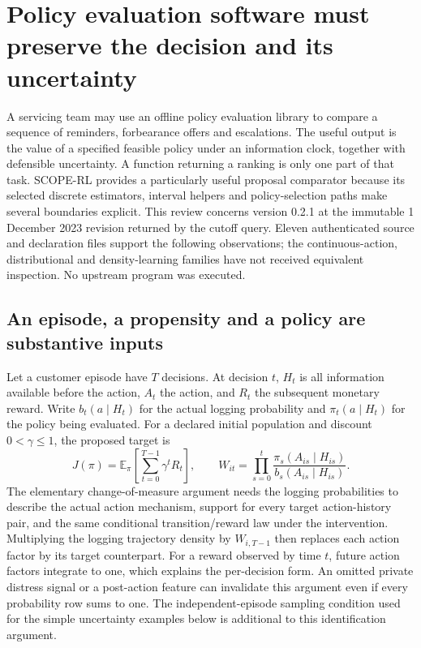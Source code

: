 \section{Policy evaluation software must preserve the decision and its uncertainty}
\label{exec23:scope-rl-scope}
A servicing team may use an offline policy evaluation library to compare a
sequence of reminders, forbearance offers and escalations. The useful output is
the value of a specified feasible policy under an information clock, together
with defensible uncertainty. A function returning a ranking is only one part of
that task. SCOPE-RL provides a particularly useful proposal comparator because
its selected discrete estimators, interval helpers and policy-selection paths
make several boundaries explicit. This review concerns version 0.2.1 at the
immutable 1 December 2023 revision returned by the cutoff query. Eleven
authenticated source and declaration files support the following observations;
the continuous-action, distributional and density-learning families have not
received equivalent inspection. No upstream program was executed.
\cite{exec23_scope_rl_sources}

\subsection{An episode, a propensity and a policy are substantive inputs}
\label{exec23:scope-rl-target}
Let a customer episode have $T$ decisions. At decision $t$, $H_t$ is all
information available before the action, $A_t$ the action, and $R_t$ the
subsequent monetary reward. Write $b_t(a\mid H_t)$ for the actual logging
probability and $\pi_t(a\mid H_t)$ for the policy being evaluated. For a declared
initial population and discount $0<\gamma\leq1$, the proposed target is
\[
 J(\pi)=\mathbb E_\pi\!\left[\sum_{t=0}^{T-1}\gamma^tR_t\right],
 \qquad
 W_{it}=\prod_{s=0}^{t}
 \frac{\pi_s(A_{is}\mid H_{is})}{b_s(A_{is}\mid H_{is})}.
\]
The elementary change-of-measure argument needs the logging probabilities to
describe the actual action mechanism, support for every target action-history
pair, and the same conditional transition/reward law under the intervention.
Multiplying the logging trajectory density by $W_{i,T-1}$ then replaces each
action factor by its target counterpart. For a reward observed by time $t$,
future action factors integrate to one, which explains the per-decision form.
An omitted private distress signal or a post-action feature can invalidate this
argument even if every probability row sums to one. The independent-episode
sampling condition used for the simple uncertainty examples below is additional
to this identification argument.

